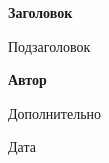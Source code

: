 \begin{titlepage}
    \begin{center}
        \vspace*{1cm}
            
        \Huge
        {\color{JournalTitle} \textsf{\textbf{Заголовок}}}
            
        \vspace{0.5cm}
        \LARGE
        Подзаголовок
            
        \vspace{1.5cm}
            
        \textbf{Автор}
            
        \vfill
            
        Дополнительно
            
        \vspace{0.8cm}
            
        \Large
        Дата
            
    \end{center}
\end{titlepage}